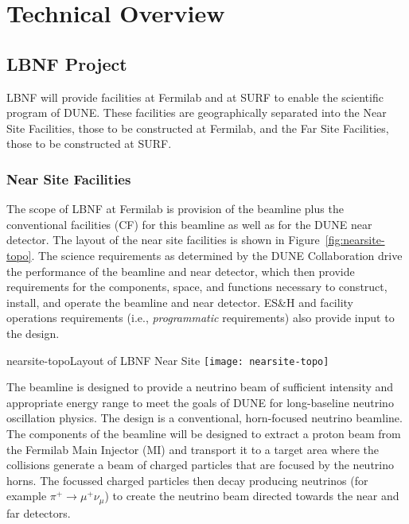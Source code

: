 
\chapter{Technical Overview}
\label{v1ch:tech-designs}
 
 
 
\section{LBNF Project}
 
LBNF will provide facilities at Fermilab and at SURF to enable the scientific program of DUNE. These facilities are geographically separated into the Near Site Facilities, those to be constructed at Fermilab, and the Far Site Facilities, those to be constructed at SURF. %
 
\subsection{Near Site Facilities}
 
The scope of LBNF at Fermilab is provision of the beamline plus the conventional facilities (CF) for this beamline as well as for the DUNE near detector. The layout of the near site facilities is shown in Figure~\ref{fig:nearsite-topo}. The science requirements as determined by the DUNE
Collaboration drive the performance of the beamline and near detector, which then provide requirements for the components, space, and functions necessary to construct, install, and operate the beamline and near detector. ES\&H and facility operations requirements (i.e., \textit{programmatic} requirements) also provide input to the design.
 
\begin{cdrfigure}{nearsite-topo}{Layout of LBNF Near Site}
  \texttt{[image: nearsite-topo]}
\end{cdrfigure}
 
 
The beamline is designed to provide a neutrino beam of sufficient intensity and appropriate energy range to meet the goals of DUNE for long-baseline neutrino oscillation physics. The design is a conventional, horn-focused neutrino beamline. The components of the beamline will be designed to extract a proton beam from the Fermilab Main Injector (MI) and transport it to a target area where the collisions generate a beam of charged particles that are focused by the neutrino horns. The focussed charged particles then decay producing neutrinos (for example $\pi^+\rightarrow \mu^+\nu_\mu$) to create the neutrino beam directed towards the near and far detectors.
 
